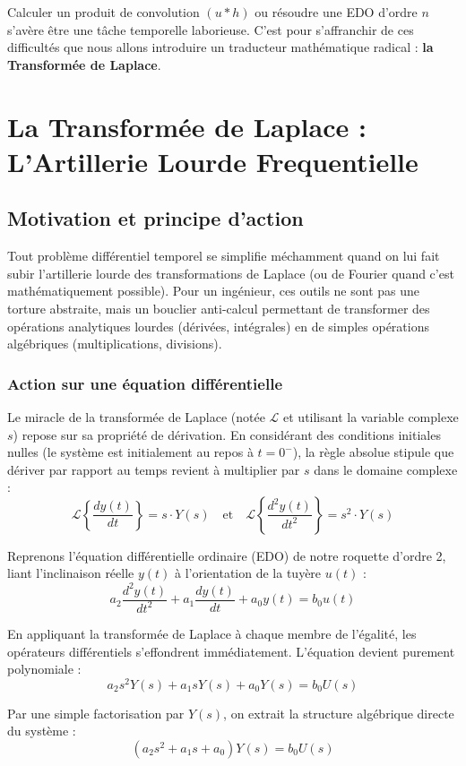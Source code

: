 \documentclass[11pt,a4paper]{report}
\begin{document}
Calculer un produit de convolution $(u * h)$ ou résoudre une EDO d'ordre $n$ s'avère être une tâche temporelle laborieuse. C'est pour s'affranchir de ces difficultés que nous allons introduire un traducteur mathématique radical : \textbf{la Transformée de Laplace}.

\chapter{La Transformée de Laplace : L'Artillerie Lourde Frequentielle}

\section{Motivation et principe d'action}

Tout problème différentiel temporel se simplifie méchamment quand on lui fait subir l'artillerie lourde des transformations de Laplace (ou de Fourier quand c'est mathématiquement possible). Pour un ingénieur, ces outils ne sont pas une torture abstraite, mais un bouclier anti-calcul permettant de transformer des opérations analytiques lourdes (dérivées, intégrales) en de simples opérations algébriques (multiplications, divisions).

\subsection{Action sur une équation différentielle}
Le miracle de la transformée de Laplace (notée $\mathcal{L}$ et utilisant la variable complexe $s$) repose sur sa propriété de dérivation. En considérant des conditions initiales nulles (le système est initialement au repos à $t = 0^-$), la règle absolue stipule que dériver par rapport au temps revient à multiplier par $s$ dans le domaine complexe :
\[ \mathcal{L}\left\{\frac{dy(t)}{dt}\right\} = s \cdot Y(s) \quad \text{et} \quad \mathcal{L}\left\{\frac{d^2y(t)}{dt^2}\right\} = s^2 \cdot Y(s) \]

Reprenons l'équation différentielle ordinaire (EDO) de notre roquette d'ordre 2, liant l'inclinaison réelle $y(t)$ à l'orientation de la tuyère $u(t)$ :
\[ a_2 \frac{d^2y(t)}{dt^2} + a_1 \frac{dy(t)}{dt} + a_0 y(t) = b_0 u(t) \]

En appliquant la transformée de Laplace à chaque membre de l'égalité, les opérateurs différentiels s'effondrent immédiatement. L'équation devient purement polynomiale :
\[ a_2 s^2 Y(s) + a_1 s Y(s) + a_0 Y(s) = b_0 U(s) \]

Par une simple factorisation par $Y(s)$, on extrait la structure algébrique directe du système :
\[ (a_2 s^2 + a_1 s + a_0) Y(s) = b_0 U(s) \]
\end{document}
